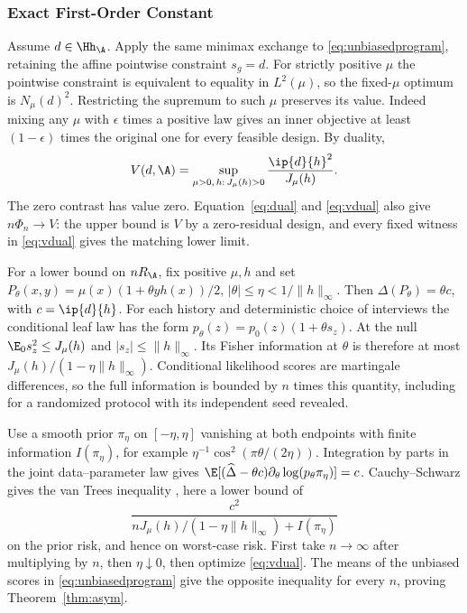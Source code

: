 \subsubsection{Exact First-Order Constant}
Assume $d\in\Hh_\A$. Apply the same minimax exchange to \eqref{eq:unbiasedprogram}, retaining the affine pointwise constraint $s_g=d$. For strictly positive $\mu$ the pointwise constraint is equivalent to equality in $L^2(\mu)$, so the fixed-$\mu$ optimum is $N_\mu(d)^2$. Restricting the supremum to such $\mu$ preserves its value. Indeed mixing any $\mu$ with $\epsilon$ times a positive law gives an inner objective at least $(1-\epsilon)$ times the original one for every feasible design. By duality,
\begin{equation}
 V(d,\A)=\sup_{\mu>0,\,h:\,J_\mu(h)>0}
                \frac{\ip{d}{h}^2}{J_\mu(h)}.\label{eq:vdual}
\end{equation}
The zero contrast has value zero. Equation~\eqref{eq:dual} and \eqref{eq:vdual} also give $n\Phi_n\to V$: the upper bound is $V$ by a zero-residual design, and every fixed witness in \eqref{eq:vdual} gives the matching lower limit.

For a lower bound on $nR_\A$, fix positive $\mu,h$ and set $P_\theta(x,y)=\mu(x)(1+\theta y h(x))/2$, $|\theta|\le\eta<1/\|h\|_\infty$. Then $\Delta(P_\theta)=\theta c$, with $c=\ip{d}{h}$. For each history and deterministic choice of interviews the conditional leaf law has the form $p_\theta(z)=p_0(z)(1+\theta s_z)$. At the null $\E_0s_z^2\le J_\mu(h)$ and $|s_z|\le\|h\|_\infty$. Its Fisher information at $\theta$ is therefore at most $J_\mu(h)/(1-\eta\|h\|_\infty)$. Conditional likelihood scores are martingale differences, so the full information is bounded by $n$ times this quantity, including for a randomized protocol with its independent seed revealed.

Use a smooth prior $\pi_\eta$ on $[-\eta,\eta]$ vanishing at both endpoints with finite information $I(\pi_\eta)$, for example $\eta^{-1}\cos^2(\pi \theta/(2\eta))$. Integration by parts in the joint data--parameter law gives $\E[(\widehat\Delta-\theta c)\partial_\theta\log(p_\theta\pi_\eta)]=c$. Cauchy--Schwarz gives the van Trees inequality \citep{gill1995}, here a lower bound of
\[
     \frac{c^2}{nJ_\mu(h)/(1-\eta\|h\|_\infty)+I(\pi_\eta)}
\]
on the prior risk, and hence on worst-case risk. First take $n\to\infty$ after multiplying by $n$, then $\eta\downarrow0$, then optimize \eqref{eq:vdual}. The means of the unbiased scores in \eqref{eq:unbiasedprogram} give the opposite inequality for every $n$, proving Theorem~\ref{thm:asym}.

